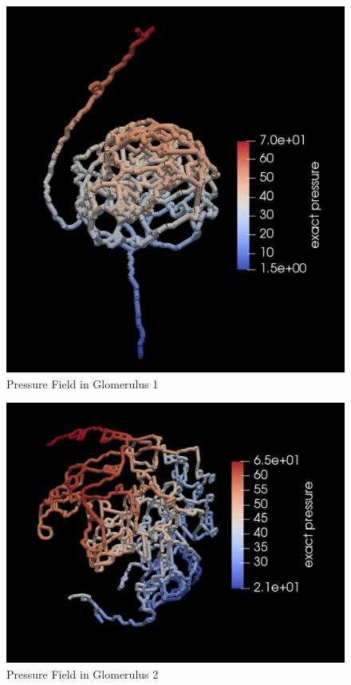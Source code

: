 \begin{figure}[h]
\centering
\includegraphics[width=162mm]{glom_pressure2}
\caption{Pressure Field in Glomerulus 1}
\label{fig:glom_pressure2}
\end{figure}
\begin{figure}[h]
\centering
\includegraphics[width=162mm]{glom2_pressure2}
\caption{Pressure Field in Glomerulus 2}
\label{fig:glom2_pressure2}
\end{figure}
